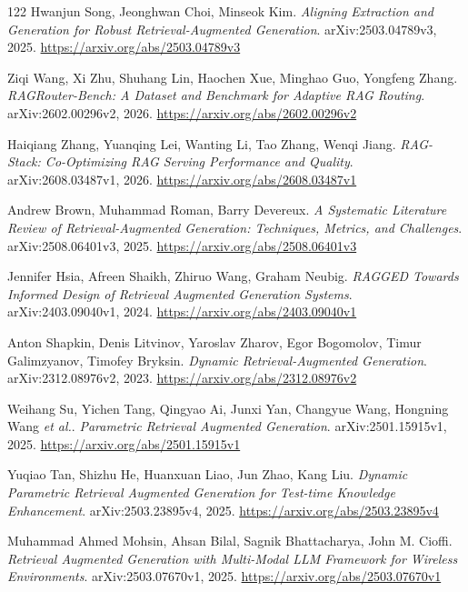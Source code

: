\documentclass[11pt,a4paper]{article}
\begin{document}
\begin{thebibliography}{122}
Hwanjun Song, Jeonghwan Choi, Minseok Kim.
\newblock \emph{Aligning Extraction and Generation for Robust Retrieval-Augmented Generation}.
\newblock arXiv:2503.04789v3, 2025.
\newblock \url{https://arxiv.org/abs/2503.04789v3}

Ziqi Wang, Xi Zhu, Shuhang Lin, Haochen Xue, Minghao Guo, Yongfeng Zhang.
\newblock \emph{RAGRouter-Bench: A Dataset and Benchmark for Adaptive RAG Routing}.
\newblock arXiv:2602.00296v2, 2026.
\newblock \url{https://arxiv.org/abs/2602.00296v2}

Haiqiang Zhang, Yuanqing Lei, Wanting Li, Tao Zhang, Wenqi Jiang.
\newblock \emph{RAG-Stack: Co-Optimizing RAG Serving Performance and Quality}.
\newblock arXiv:2608.03487v1, 2026.
\newblock \url{https://arxiv.org/abs/2608.03487v1}

Andrew Brown, Muhammad Roman, Barry Devereux.
\newblock \emph{A Systematic Literature Review of Retrieval-Augmented Generation: Techniques, Metrics, and Challenges}.
\newblock arXiv:2508.06401v3, 2025.
\newblock \url{https://arxiv.org/abs/2508.06401v3}

Jennifer Hsia, Afreen Shaikh, Zhiruo Wang, Graham Neubig.
\newblock \emph{RAGGED Towards Informed Design of Retrieval Augmented Generation Systems}.
\newblock arXiv:2403.09040v1, 2024.
\newblock \url{https://arxiv.org/abs/2403.09040v1}

Anton Shapkin, Denis Litvinov, Yaroslav Zharov, Egor Bogomolov, Timur Galimzyanov, Timofey Bryksin.
\newblock \emph{Dynamic Retrieval-Augmented Generation}.
\newblock arXiv:2312.08976v2, 2023.
\newblock \url{https://arxiv.org/abs/2312.08976v2}

Weihang Su, Yichen Tang, Qingyao Ai, Junxi Yan, Changyue Wang, Hongning Wang \emph{et al.}.
\newblock \emph{Parametric Retrieval Augmented Generation}.
\newblock arXiv:2501.15915v1, 2025.
\newblock \url{https://arxiv.org/abs/2501.15915v1}

Yuqiao Tan, Shizhu He, Huanxuan Liao, Jun Zhao, Kang Liu.
\newblock \emph{Dynamic Parametric Retrieval Augmented Generation for Test-time Knowledge Enhancement}.
\newblock arXiv:2503.23895v4, 2025.
\newblock \url{https://arxiv.org/abs/2503.23895v4}

Muhammad Ahmed Mohsin, Ahsan Bilal, Sagnik Bhattacharya, John M. Cioffi.
\newblock \emph{Retrieval Augmented Generation with Multi-Modal LLM Framework for Wireless Environments}.
\newblock arXiv:2503.07670v1, 2025.
\newblock \url{https://arxiv.org/abs/2503.07670v1}


\end{thebibliography}
\end{document}

